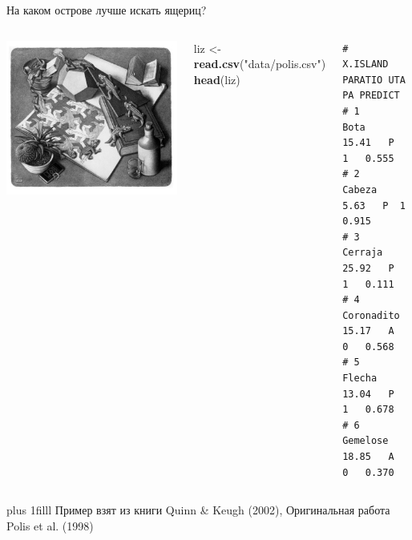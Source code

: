\documentclass[ignorenonframetext,]{beamer}
\newenvironment{Shaded}{\begin{snugshade}}{\end{snugshade}}
\newcommand{\KeywordTok}[1]{\textcolor[rgb]{0.13,0.29,0.53}{\textbf{{#1}}}}
\newcommand{\StringTok}[1]{\textcolor[rgb]{0.31,0.60,0.02}{{#1}}}
\newcommand{\NormalTok}[1]{{#1}}
\newcommand{\columnsbegin}{\begin{columns}}
\newcommand{\columnsend}{\end{columns}}
\begin{document}
\begin{frame}[fragile]{На каком острове лучше искать ящериц?}

\columnsbegin


\includegraphics[width=\linewidth] {images/esher.jpg}


\begin{Shaded}
\begin{Highlighting}[]
\NormalTok{liz <-}\StringTok{ }\KeywordTok{read.csv}\NormalTok{(}\StringTok{"data/polis.csv"}\NormalTok{)}
\KeywordTok{head}\NormalTok{(liz)}
\end{Highlighting}
\end{Shaded}

\begin{verbatim}
#     X.ISLAND PARATIO UTA PA PREDICT
# 1       Bota   15.41   P  1   0.555
# 2     Cabeza    5.63   P  1   0.915
# 3    Cerraja   25.92   P  1   0.111
# 4 Coronadito   15.17   A  0   0.568
# 5     Flecha   13.04   P  1   0.678
# 6   Gemelose   18.85   A  0   0.370
\end{verbatim}

\columnsend

\vskip0pt plus 1filll
\tiny{Пример взят из книги Quinn \& Keugh (2002), Оригинальная работа Polis et al. (1998)}

\end{frame}
\end{document}

